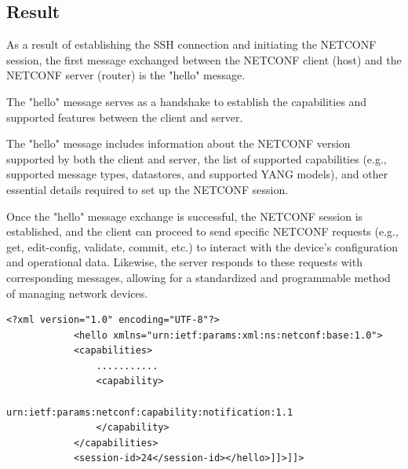 \subsection{Result}

As a result of establishing the SSH connection and initiating the NETCONF session, the first message exchanged between the NETCONF client (host) and the NETCONF server (router) is the "hello" message. 

The "hello" message serves as a handshake to establish the capabilities and supported features between the client and server.

The "hello" message includes information about the NETCONF version supported by both the client and server, the list of supported capabilities (e.g., supported message types, datastores, and supported YANG models), and other essential details required to set up the NETCONF session.

Once the "hello" message exchange is successful, the NETCONF session is established, and the client can proceed to send specific NETCONF requests (e.g., get, edit-config, validate, commit, etc.) to interact with the device's configuration and operational data. Likewise, the server responds to these requests with corresponding messages, allowing for a standardized and programmable method of managing network devices.


\begin{lstlisting}[style=xmlStyle, caption={Excerpt from "hello" message.},  backgroundcolor=\color{codebackground}]
            <?xml version="1.0" encoding="UTF-8"?>
            <hello xmlns="urn:ietf:params:xml:ns:netconf:base:1.0">
            <capabilities>
                ...........
                <capability>
                    urn:ietf:params:netconf:capability:notification:1.1
                </capability>
            </capabilities>
            <session-id>24</session-id></hello>]]>]]>
\end{lstlisting}



